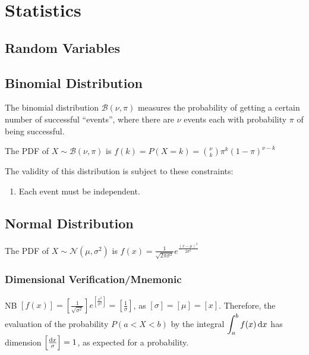 \documentclass[a4paper,11pt]{article}
\begin{document}
    \section{Statistics}

    \subsection{Random Variables}

    \subsection{Binomial Distribution}


    The binomial distribution $\mathcal B(\nu, \pi)$ measures the probability of
    getting a certain number of successful ``events'', where there are $\nu$
    events each with probability $\pi$ of being successful.

    The PDF of $X \sim \mathcal B(\nu, \pi)$ is
    $\displaystyle f(k) = P(X = k) = {\nu \choose k} \pi^k (1 - \pi)^{\nu - k}$

    The validity of this distribution is subject to these constraints:
    \begin{enumerate}
    \item Each event must be independent.
    \end{enumerate}

    \subsection{Normal Distribution}


    The PDF of $X \sim \mathcal N(\mu, \sigma^2)$ is
    $\displaystyle f(x) = \frac{1}{\sqrt{2\pi\sigma^2}}
                            e^{\frac{(x - \mu)^2}{2\sigma^2}}$

    \subsubsection{Dimensional Verification/Mnemonic}

    NB $\displaystyle\left[f(x)\right] =
        \left[\frac 1{\sqrt{\sigma^2}}\right]
        e^{\left[\frac{x^2}{\sigma^2}\right]}
      = \left[\frac 1\sigma\right]$, as
    $\left[\sigma\right] = \left[\mu\right] = \left[x\right]$. Therefore, the
    evaluation of the probability $P(a < X < b)$ by the integral
    $\displaystyle\int_a^bf(x)\dif x$ has dimension
    $\left[\frac{\dif x}{\sigma}\right] = 1$, as expected for a probability.
\end{document}
